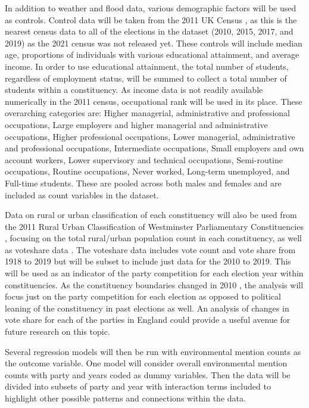 \documentclass[12pt,letterpaper]{article}
\begin{document}
In addition to weather and flood data, various demographic factors will be used as controls. Control data will be taken from the 2011 UK Census \autocite{2011CensusOffice}, as this is the nearest census data to all of the elections in the dataset (2010, 2015, 2017, and 2019) as the 2021 census was not released yet. These controls will include median age, proportions of individuals with various educational attainment, and average income. In order to use educational attainment, the total number of students, regardless of employment status, will be summed to collect a total number of students within a constituency. As income data is not readily available numerically in the 2011 census, occupational rank will be used in its place. These overarching categories are: Higher managerial, administrative and professional occupations, Large employers and higher managerial and administrative occupations, Higher professional occupations, Lower managerial, administrative and professional occupations, Intermediate occupations, Small employers and own account workers, Lower supervisory and technical occupations, Semi-routine occupations, Routine occupations, Never worked, Long-term unemployed, and Full-time students. These are pooled across both males and females and are included as count variables in the dataset.

Data on rural or urban classification of each constituency will also be used from the 2011 Rural Urban Classification of Westminster Parliamentary Constituencies \autocite{RuralUrbanClassification}, focusing on the total rural/urban population count in each constituency, as well as voteshare data \autocite{watsonGeneralElectionResults2024}. The voteshare data includes vote count and vote share from 1918 to 2019 but will be subset to include just data for the 2010 to 2019. This will be used as an indicator of the party competition for each election year within constituencies. As the constituency boundaries changed in 2010 \autocite{cracknell2010GeneralElection2024}, the analysis will focus just on the party competition for each election as opposed to political leaning of the constituency in past elections as well. An analysis of changes in vote share for each of the parties in England could provide a useful avenue for future research on this topic. 

Several regression models will then be run with environmental mention counts as the outcome variable. One model will consider overall environmental mention counts with party and years coded as dummy variables. Then the data will be divided into subsets of party and year with interaction terms included to highlight other possible patterns and connections within the data. 
	
\end{document}
